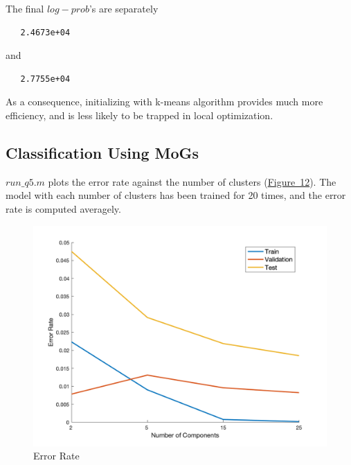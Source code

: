 \documentclass{article}
\begin{document}
The final $log-prob$'s are separately
\begin{verbatim}
   2.4673e+04
\end{verbatim}
and
\begin{verbatim}
   2.7755e+04
\end{verbatim}

As a consequence, initializing with k-means algorithm provides much more efficiency, and is less likely to be trapped in local optimization.

\subsection{Classification Using MoGs}
$run\_q5.m$ plots the error rate against the number of clusters (\hyperref[fig-12]{Figure~12}). The model with each number of clusters has been trained for 20 times, and the error rate is computed averagely.

\begin{figure}
	\centering
	\includegraphics[scale=0.3]{q5.png}
	\caption{Error Rate}
	\label{fig-12}
\end{figure}
\end{document}
